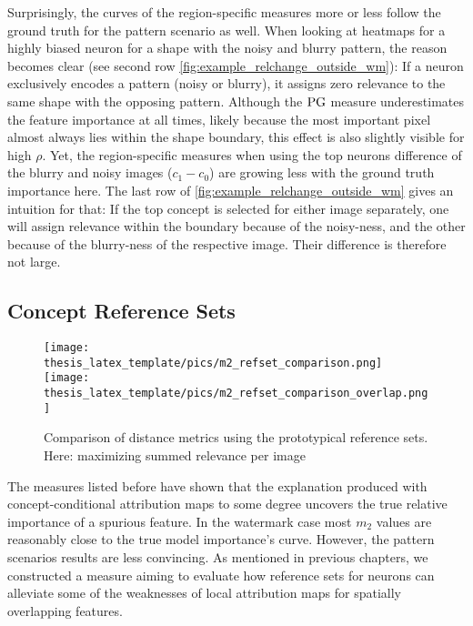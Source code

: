 Surprisingly, the curves of the region-specific measures more or less follow the ground truth for the pattern scenario as well. When looking at heatmaps for a highly biased neuron for a shape with the noisy and blurry pattern, the reason becomes clear (see second row \cref{fig:example_relchange_outside_wm}): If a neuron exclusively encodes a pattern (noisy or blurry), it assigns zero relevance to the same shape with the opposing pattern. Although the $\operatorname*{PG}$ measure underestimates the feature importance at all times, likely because the most important pixel almost always lies within the shape boundary, this effect is also slightly visible for high $\rho$. 
Yet, the region-specific measures when using the top neurons difference of the blurry and noisy images ($c_1- c_0$)  are growing less with the ground truth importance here. The last row of \cref{fig:example_relchange_outside_wm} gives an intuition for that: If the top concept is selected for either image separately, one will assign relevance within the boundary because of the noisy-ness, and the other because of the blurry-ness of the respective image. Their difference is therefore not large. 

\subsection{Concept Reference Sets}
\begin{figure}[ht!]
    \centering
    \texttt{[image: thesis\_latex\_template/pics/m2\_refset\_comparison.png]}
    \texttt{[image: thesis\_latex\_template/pics/m2\_refset\_comparison\_overlap.png]}
    \caption[Concept Reference Sets, Comparison of Metrics]{Comparison of distance metrics using the prototypical reference sets. Here: maximizing summed relevance per image }
    \label{fig:m2_refset_relevance}
\end{figure}
The measures listed before have shown that the explanation produced with concept-conditional attribution maps to some degree uncovers the true relative importance of a spurious feature.
In the watermark case most $m_2$ values are reasonably close to the true model importance's curve.
However, the pattern scenarios results are less convincing. As mentioned in previous chapters, we constructed a measure aiming to evaluate how reference sets for neurons can alleviate some of the weaknesses of local attribution maps for spatially overlapping features. 


